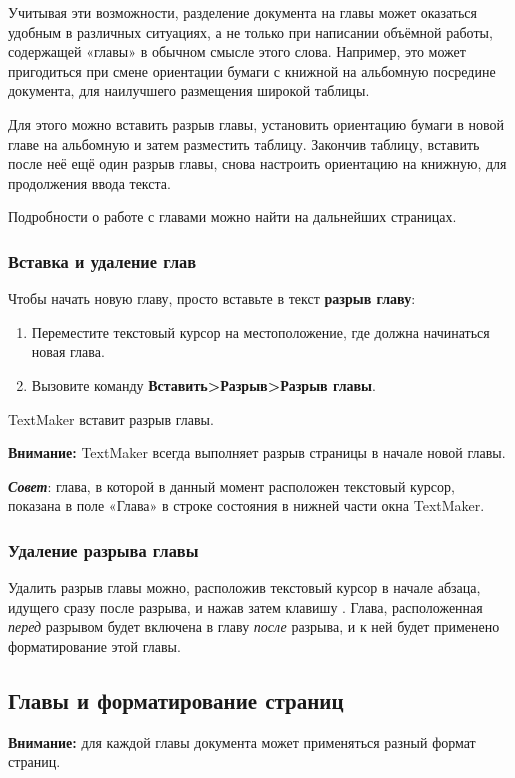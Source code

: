 ﻿\documentclass[a4paper,10pt]{article}
\begin{document}
Учитывая эти возможности, разделение документа на главы может оказаться удобным в различных ситуациях, а не только при написании объёмной работы, содержащей «главы» в обычном смысле этого слова. Например, это может пригодиться при смене ориентации бумаги с книжной на альбомную посредине документа, для наилучшего размещения широкой таблицы.

Для этого можно вставить разрыв главы, установить ориентацию бумаги в новой главе на альбомную и затем разместить таблицу. Закончив таблицу, вставить после неё ещё один разрыв главы, снова настроить ориентацию на книжную, для продолжения ввода текста.

Подробности о работе с главами можно найти на дальнейших страницах.

\subsubsection{Вставка и удаление глав}
Чтобы начать новую главу, просто вставьте в текст \textbf{разрыв главу}:
\begin{enumerate}
 \item Переместите текстовый курсор на местоположение, где должна начинаться новая глава.
 \item Вызовите команду \textbf{Вставить>Разрыв>Разрыв главы}.\\
 \end{enumerate}
 
 TextMaker вставит разрыв главы.
 
 \begin{mdframed}[backgroundcolor=blue!10]
\textbf{Внимание:} TextMaker всегда выполняет разрыв страницы в начале новой главы.
\end{mdframed}

\textbf{\textit{Совет}}: глава, в которой в данный момент расположен текстовый курсор, показана в поле «Глава» в строке состояния в нижней части окна TextMaker.

\subsubsection{Удаление разрыва главы}
Удалить разрыв главы можно, расположив текстовый курсор в начале абзаца, идущего сразу после разрыва, и нажав затем клавишу . Глава, расположенная \textit{перед} разрывом будет включена в главу \textit{после} разрыва, и к ней будет применено форматирование этой главы.

\subsection{Главы и форматирование страниц}
\begin{mdframed}[backgroundcolor=blue!10]
\textbf{Внимание:} для каждой главы документа может применяться разный формат страниц.
\end{mdframed}
\end{document}
